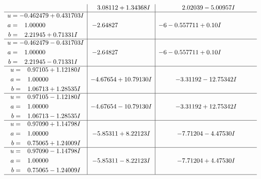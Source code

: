 \documentclass[1p]{elsarticle_modified}
\theoremstyle{definition}
\begin{document}
$$\begin{array}{c|c|c}
 & \phantom{-}3.08112 + 1.34368 I & \phantom{-}2.02039 - 5.00957 I \\ \hline\begin{aligned}
u &= -0.462479 + 0.431703 I \\
a &= \phantom{-}1.00000\phantom{ +0.000000I} \\
b &= \phantom{-}2.21945 + 0.71331 I\end{aligned}
 & -2.64827\phantom{ +0.000000I} &                  -6
-0.557711 + 0. 10   I\phantom{ +0.000000I} \\ \hline\begin{aligned}
u &= -0.462479 - 0.431703 I \\
a &= \phantom{-}1.00000\phantom{ +0.000000I} \\
b &= \phantom{-}2.21945 - 0.71331 I\end{aligned}
 & -2.64827\phantom{ +0.000000I} &                  -6
-0.557711 + 0. 10   I\phantom{ +0.000000I} \\ \hline\begin{aligned}
u &= \phantom{-}0.97105 + 1.12180 I \\
a &= \phantom{-}1.00000\phantom{ +0.000000I} \\
b &= \phantom{-}1.06713 + 1.28535 I\end{aligned}
 & -4.67654 + 10.79130 I & -3.31192 - 12.75342 I \\ \hline\begin{aligned}
u &= \phantom{-}0.97105 - 1.12180 I \\
a &= \phantom{-}1.00000\phantom{ +0.000000I} \\
b &= \phantom{-}1.06713 - 1.28535 I\end{aligned}
 & -4.67654 - 10.79130 I & -3.31192 + 12.75342 I \\ \hline\begin{aligned}
u &= \phantom{-}0.97090 + 1.14798 I \\
a &= \phantom{-}1.00000\phantom{ +0.000000I} \\
b &= \phantom{-}0.75065 + 1.24009 I\end{aligned}
 & -5.85311 + 8.22123 I & -7.71204 - 4.47530 I \\ \hline\begin{aligned}
u &= \phantom{-}0.97090 - 1.14798 I \\
a &= \phantom{-}1.00000\phantom{ +0.000000I} \\
b &= \phantom{-}0.75065 - 1.24009 I\end{aligned}
 & -5.85311 - 8.22123 I & -7.71204 + 4.47530 I\\
 \hline 
 \end{array}$$\newpage\newpage\renewcommand{\arraystretch}{1}
\end{document}
